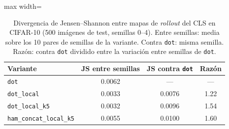 \begin{table}[tbp]
\centering
\small
\caption{Divergencia de Jensen--Shannon entre mapas de \emph{rollout} del CLS en CIFAR-10 (500 imágenes de test, semillas 0--4). Entre semillas: media sobre los 10 pares de semillas de la variante. Contra \texttt{dot}: misma semilla. Razón: contra \texttt{dot} dividido entre la variación entre semillas de \texttt{dot}.}
\label{tab:mapas}
\begin{adjustbox}{max width=\columnwidth}
\begin{tabular}{lccc}
\toprule
Variante & JS entre semillas & JS contra \texttt{dot} & Razón \\
\midrule
\texttt{dot} & 0.0062 & --- & --- \\
\texttt{dot\_local} & 0.0033 & 0.0076 & 1.22 \\
\texttt{dot\_local\_k5} & 0.0032 & 0.0096 & 1.54 \\
\texttt{ham\_concat\_local\_k5} & 0.0055 & 0.0100 & 1.60 \\
\bottomrule
\end{tabular}
\end{adjustbox}
\end{table}
